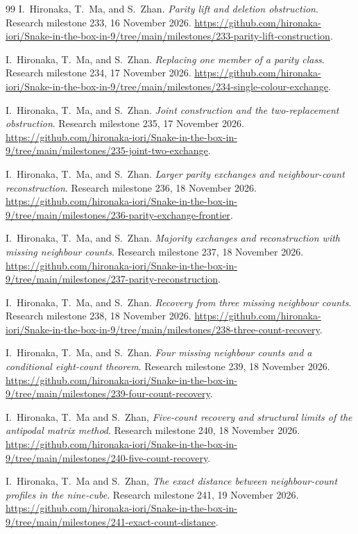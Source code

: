 \documentclass[11pt,a4paper]{article}
\theoremstyle{definition}
\theoremstyle{remark}
\begin{document}
\begin{thebibliography}{99}
I.~Hironaka, T.~Ma, and S.~Zhan. \emph{Parity lift and deletion obstruction}.
Research milestone 233, 16 November 2026.
\url{https://github.com/hironaka-iori/Snake-in-the-box-in-9/tree/main/milestones/233-parity-lift-construction}.

I.~Hironaka, T.~Ma, and S.~Zhan. \emph{Replacing one member of a parity class}.
Research milestone 234, 17 November 2026.
\url{https://github.com/hironaka-iori/Snake-in-the-box-in-9/tree/main/milestones/234-single-colour-exchange}.

I.~Hironaka, T.~Ma, and S.~Zhan. \emph{Joint construction and the
two-replacement obstruction}. Research milestone 235, 17 November 2026.
\url{https://github.com/hironaka-iori/Snake-in-the-box-in-9/tree/main/milestones/235-joint-two-exchange}.

I.~Hironaka, T.~Ma, and S.~Zhan. \emph{Larger parity exchanges and
neighbour-count reconstruction}. Research milestone 236, 18 November 2026.
\url{https://github.com/hironaka-iori/Snake-in-the-box-in-9/tree/main/milestones/236-parity-exchange-frontier}.

I.~Hironaka, T.~Ma, and S.~Zhan. \emph{Majority exchanges and reconstruction
with missing neighbour counts}. Research milestone 237, 18 November 2026.
\url{https://github.com/hironaka-iori/Snake-in-the-box-in-9/tree/main/milestones/237-parity-reconstruction}.

I.~Hironaka, T.~Ma, and S.~Zhan. \emph{Recovery from three missing neighbour
counts}. Research milestone 238, 18 November 2026.
\url{https://github.com/hironaka-iori/Snake-in-the-box-in-9/tree/main/milestones/238-three-count-recovery}.

I.~Hironaka, T.~Ma, and S.~Zhan. \emph{Four missing neighbour counts and a
conditional eight-count theorem}. Research milestone 239, 18 November 2026.
\url{https://github.com/hironaka-iori/Snake-in-the-box-in-9/tree/main/milestones/239-four-count-recovery}.

I.~Hironaka, T.~Ma and S.~Zhan, \emph{Five-count recovery and structural
limits of the antipodal matrix method}. Research milestone 240,
18 November 2026.
\url{https://github.com/hironaka-iori/Snake-in-the-box-in-9/tree/main/milestones/240-five-count-recovery}.

I.~Hironaka, T.~Ma and S.~Zhan, \emph{The exact distance between
neighbour-count profiles in the nine-cube}. Research milestone 241,
19 November 2026.
\url{https://github.com/hironaka-iori/Snake-in-the-box-in-9/tree/main/milestones/241-exact-count-distance}.


\end{thebibliography}
\end{document}
